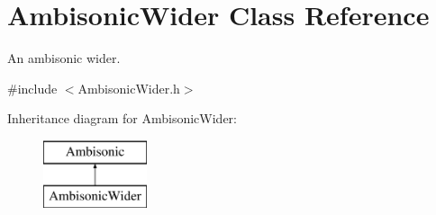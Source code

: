 \hypertarget{class_ambisonic_wider}{\section{Ambisonic\-Wider Class Reference}
\label{class_ambisonic_wider}
}


An ambisonic wider.  




{\ttfamily \#include $<$Ambisonic\-Wider.\-h$>$}

Inheritance diagram for Ambisonic\-Wider\-:\begin{figure}[H]
\begin{center}
\leavevmode
\includegraphics[height=2.000000cm]{class_ambisonic_wider}
\end{center}
\end{figure}
